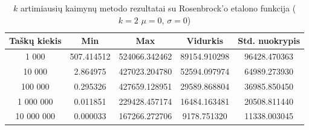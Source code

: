 \begin{table}[H]
    \centering
    \begin{tabular}{|c|c|c|c|c|}
        \hline
        \textbf{Taškų kiekis} & \textbf{Min} & \textbf{Max} & \textbf{Vidurkis} & \textbf{Std. nuokrypis} \\ \hline
        1 000        & 507.414512 & 524066.342462 & 89154.910298 & 96428.470363 \\ \hline
        10 000       & 2.864975 & 427023.204780 & 52594.097974 & 64989.273930 \\ \hline
        100 000      & 0.295326 & 427659.128951 & 29589.868804 & 36985.850450 \\ \hline
        1 000 000    & 0.011851 & 229428.457174 & 16484.163481 & 20508.811440 \\ \hline
        10 000 000   & 0.000033 & 167266.272706 & 9178.751320 & 11338.003045 \\ \hline
    \end{tabular}
    \caption{$k$ artimiausių kaimynų metodo rezultatai su Rosenbrock'o etalono funkcija ($k = 2$ $\mu = 0$, $\sigma = 0$)}
\end{table}